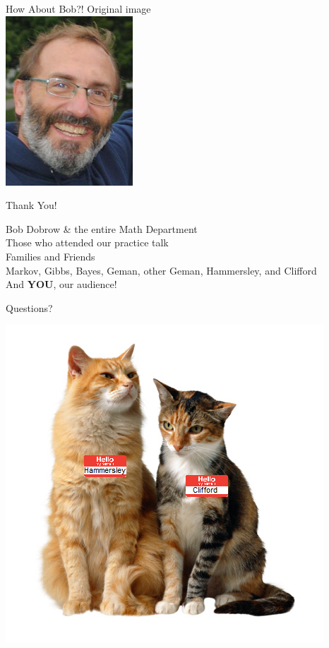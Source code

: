 \documentclass[10pt]{beamer}
\begin{document}
\begin{frame}{How About Bob?!}
\centering
Original image
\\
\includegraphics[height=40ex]{results/bob} 
\end{frame}

\begin{frame}{Thank You!}
\begin{center}
Bob Dobrow \& the entire Math Department
\\[2ex]
Those who attended our practice talk
\\[2ex]
Families and Friends
\\[2ex]
Markov, Gibbs, Bayes, Geman, other Geman, Hammersley, and Clifford
\\[2ex]
And \textbf{YOU}, our audience!
\end{center}
\end{frame}

\begin{frame}{Questions?}
\vspace{-1ex}
\begin{center}
\includegraphics[scale=0.7]{img/hammersley-clifford_cats} 
\end{center}
\end{frame}
\end{document}
